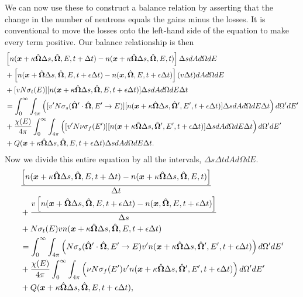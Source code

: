 We can now use these to construct a balance relation by asserting that the change in the number of neutrons equals the gains minus the losses. It is conventional to move the losses onto the left-hand side of the equation to make every term positive. Our balance relationship is then
\begin{align}
  &\left[ n( \bm{x} + \kappa \hat{\mathbf{\Omega}} \Delta s, \hat{\mathbf{\Omega}}, E, t + \Delta t ) - n( \bm{x} + \kappa \hat{\mathbf{\Omega}} \Delta s, \hat{\mathbf{\Omega}}, E, t ) \right] \Delta s dA d\Omega dE \nonumber \\*
  &+ \left[ n( \bm{x} + \hat{\mathbf{\Omega}} \Delta s , \hat{\mathbf{\Omega}}, E, t + \epsilon \Delta t ) - n( \bm{x} , \hat{\mathbf{\Omega}}, E, t + \epsilon \Delta t ) \right]  ( v \Delta t ) dA d\Omega dE \nonumber \\*
  &+ [ v N \sigma_t(E) ] [ n( \bm{x} + \kappa \hat{\mathbf{\Omega}} \Delta s, \hat{\mathbf{\Omega}}, E, t + \epsilon \Delta t )  ] \Delta s dA d\Omega dE \Delta t \nonumber \\*
  &= \int_0^\infty \int_{4\pi} \left( [ v' N \sigma_s(\hat{\mathbf{\Omega}}' \cdot \hat{\mathbf{\Omega}}, E' \rightarrow E ) ] [ n( \bm{x} + \kappa \hat{\mathbf{\Omega}} \Delta s, \hat{\mathbf{\Omega}}', E', t + \epsilon \Delta t )  ] \Delta s dA d\Omega dE \Delta t \right) d\Omega' dE' \nonumber \\*
  &+ \frac{\chi(E)}{4\pi} \int_0^\infty \int_{4\pi} \left( [ v' N \nu \sigma_f(E') ] [ n( \bm{x} + \kappa \hat{\mathbf{\Omega}} \Delta s, \hat{\mathbf{\Omega}}', E', t + \epsilon \Delta t )  ] \Delta s dA d\Omega dE \Delta t \right) d\Omega' dE' \nonumber \\*
  &+ Q( \bm{x} + \kappa \hat{\mathbf{\Omega}} \Delta s, \hat{\mathbf{\Omega}}, E, t + \epsilon \Delta t )  \Delta s dA d\Omega dE \Delta t.
\end{align}
Now we divide this entire equation by all the intervals, $\Delta s \Delta t dA d\Omega dE$.
\begin{align}
  &\frac{ \left[ n( \bm{x} + \kappa \hat{\mathbf{\Omega}} \Delta s , \hat{\mathbf{\Omega}}, E, t + \Delta t ) - n( \bm{x} + \kappa \hat{\mathbf{\Omega}} \Delta s , \hat{\mathbf{\Omega}}, E, t ) \right] }{ \Delta t } \nonumber \\*
  &+ \frac{ v \left[ n( \bm{x} + \hat{\mathbf{\Omega}} \Delta s , \hat{\mathbf{\Omega}}, E, t + \epsilon \Delta t ) - n( \bm{x} , \hat{\mathbf{\Omega}}, E, t + \epsilon \Delta t ) \right] }{ \Delta s } \nonumber \\*
  &+ N \sigma_t(E) v n( \bm{x} + \kappa \hat{\mathbf{\Omega}} \Delta s, \hat{\mathbf{\Omega}}, E, t + \epsilon \Delta t )  \nonumber \\*
  &= \int_0^\infty \int_{4\pi} \left(  N \sigma_s(\hat{\mathbf{\Omega}}' \cdot \hat{\mathbf{\Omega}}, E' \rightarrow E ) v' n( \bm{x} + \kappa \hat{\mathbf{\Omega}} \Delta s, \hat{\mathbf{\Omega}}', E', t + \epsilon \Delta t ) \right) d\Omega' dE' \nonumber \\*
  &+ \frac{\chi(E)}{4\pi} \int_0^\infty \int_{4\pi} \left( \nu N \sigma_f(E') v' n( \bm{x} + \kappa \hat{\mathbf{\Omega}} \Delta s, \hat{\mathbf{\Omega}}', E', t + \epsilon \Delta t ) \right) d\Omega' dE' \nonumber \\*
  &+ Q( \bm{x} + \kappa \hat{\mathbf{\Omega}} \Delta s, \hat{\mathbf{\Omega}}, E, t + \epsilon \Delta t ) ,
\end{align}
